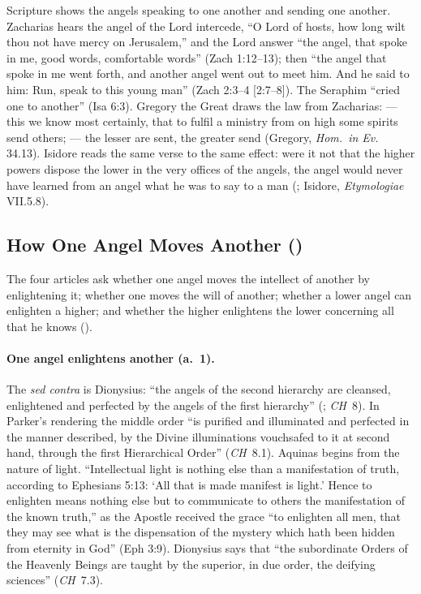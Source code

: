 Scripture shows the angels speaking to one another and sending one
another. Zacharias hears the angel of the Lord intercede, ``O Lord of
hosts, how long wilt thou not have mercy on Jerusalem,'' and the Lord
answer ``the angel, that spoke in me, good words, comfortable words''
(Zach 1:12--13); then ``the angel that spoke in me went forth, and another
angel went out to meet him. And he said to him: Run, speak to this young
man'' (Zach 2:3--4 [2:7--8]). The Seraphim ``cried one to another'' (Isa 6:3).
Gregory the Great draws the law from Zacharias:  --- this we know most certainly, that to fulfil a ministry
from on high some spirits send others;  --- the lesser are sent,
the greater send (Gregory, \emph{Hom.\ in Ev.} 34.13). Isidore reads
the same verse to the same effect: were it not that the higher powers
dispose the lower in the very offices of the angels, the angel would never
have learned from an angel what he was to say to a man (; Isidore,
\emph{Etymologiae} VII.5.8).

\subsection{How One Angel Moves Another ()}\label{sec:q106}

The four articles ask whether one angel moves the intellect of another by
enlightening it; whether one moves the will of another; whether a lower
angel can enlighten a higher; and whether the higher enlightens the lower
concerning all that he knows ().

\paragraph{One angel enlightens another (a.~1).} The \emph{sed contra} is
Dionysius: ``the angels of the second hierarchy are cleansed, enlightened
and perfected by the angels of the first hierarchy'' (; \emph{CH}~8). In Parker's rendering the middle order
``is purified and illuminated and perfected in the manner described, by
the Divine illuminations vouchsafed to it at second hand, through the first
Hierarchical Order'' (\emph{CH}~8.1). Aquinas begins from the nature of
light. ``Intellectual light is nothing else than a manifestation of truth,
according to Ephesians 5:13: `All that is made manifest is light.' Hence to
enlighten means nothing else but to communicate to others the manifestation
of the known truth,'' as the Apostle received the grace ``to enlighten all
men, that they may see what is the dispensation of the mystery which hath
been hidden from eternity in God'' (Eph 3:9). Dionysius says that ``the
subordinate Orders of the Heavenly Beings are taught by the superior, in due
order, the deifying sciences'' (\emph{CH}~7.3).

